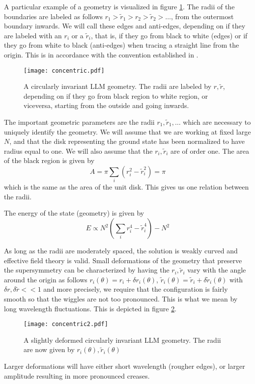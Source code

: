 \documentclass[12pt,nofootinbib, longbibliography]{revtex4-1}
\begin{document}
A particular example of a geometry is visualized in figure \ref{fig:concentric}. The radii of the boundaries are labeled as follows $r_1>\tilde r_1>r_2>\tilde r_2 >\dots $, from the outermost boundary inwards. We will call these edges and anti-edges, depending on if they are labeled with an $r_i$ or a $\tilde r_i$, that is, if they go from black to white (edges) or if they go from white to black (anti-edges) when tracing a straight line from the origin. This is in accordance with the convention established in \cite{Berenstein:2017abm}.
\begin{figure}[ht]
\begin{center}
\texttt{[image: concentric.pdf]}\caption{A circularly invariant LLM geometry. The radii are labeled by $r,\tilde r$, depending on if they go from black region to 
white region, or viceversa, starting from the outside and going inwards.} \label{fig:concentric}
\end{center}
\end{figure}
The important geometric parameters are the radii $r_1, \tilde r_1, \dots$ which are necessary to uniquely identify the geometry. We will assume that we are working at fixed large $N$, and that the disk representing the ground state has been normalized to have radius equal to one. We will also assume that the $r_i, \tilde r_i$ are of order one. The area of the black region is given by
\begin{equation}
A= \pi \sum_i( r_i^2 -\tilde r_i^2) = \pi
\end{equation}
which is the same as the area of the unit disk. This gives us one relation between the radii.

 The energy of the state (geometry) is given by 
\begin{equation}
E \propto N^2\left( \sum_i r_i^4 -\tilde r_i^4\right )-N^2
\end{equation}

As long as the radii are moderately spaced, the solution is weakly curved and effective field theory is valid. Small deformations of the geometry that preserve the supersymmetry can be  characterized by 
having the $r_i, \tilde r_i$ vary with the angle around the origin as follows $r_i(\theta)= r_i +\delta r_i(\theta)$, $\tilde r_i(\theta) =\tilde  r_i +\delta \tilde r_i(\theta)$ with $\delta r, \delta \tilde r<<1$
and more precisely, we require that the configuration is fairly smooth so that the wiggles are not too pronounced. This is what we mean by long wavelength fluctuations. This is depicted in figure \ref{fig:concentric2}.
\begin{figure}[ht]
\begin{center}
\texttt{[image: concentric2.pdf]}\caption{A  slightly deformed circularly invariant LLM geometry. The radii are now given by $r_i(\theta),\tilde r_i(\theta)$} \label{fig:concentric2}
\end{center}
\end{figure}
Larger deformations will have either short wavelength (rougher edges), or larger amplitude resulting in more pronounced creases.
\end{document}
